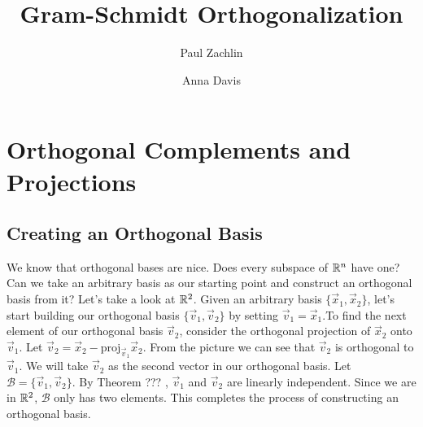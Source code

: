 \documentclass{ximera}
\author{Paul Zachlin \and Anna Davis} \title{Gram-Schmidt Orthogonalization} \license{CC-BY 4.0}
\begin{document}
\begin{abstract}

\end{abstract}
\maketitle

\section*{Orthogonal Complements and Projections}\label{sec:8_1}

\subsection*{Creating an Orthogonal Basis}
We know that orthogonal bases are nice.  Does every subspace of $\mathbb{R}^n$ have one?  Can we take an arbitrary basis as our starting point and construct an orthogonal basis from it?  Let's take a look at $\mathbb{R}^2$.  Given an arbitrary basis $\{\vec{x}_1, \vec{x}_2\}$, let's start building our orthogonal basis $\{\vec{v}_1, \vec{v}_2\}$ by setting $\vec{v}_1 = \vec{x}_1$.To find the next element of our orthogonal basis $\vec{v}_2$, consider the orthogonal projection of $\vec{x}_2$ onto $\vec{v}_1$.  Let $\vec{v}_2=\vec{x}_2-\mbox{proj}_{\vec{v}_1}\vec{x}_2$.  From the picture we can see that $\vec{v}_2$ is orthogonal to $\vec{v}_1$.  We will take $\vec{v}_2$ as the second vector in our orthogonal basis.  Let $\mathcal{B}=\{\vec{v}_1,\vec{v}_2\}$.  By Theorem ??? , $\vec{v}_1$ and $\vec{v}_2$ are linearly independent.  Since we are in $\mathbb{R}^2$, $\mathcal{B}$ only has two elements.  This completes the process of constructing an orthogonal basis.
\begin{center}
\end{center}
\end{document}
